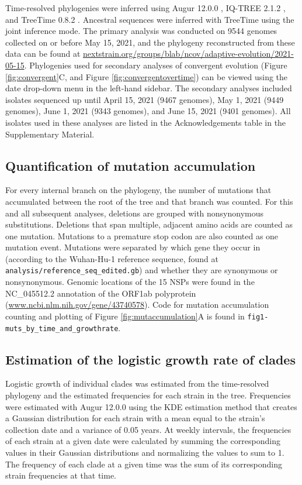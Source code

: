 \documentclass[11pt,oneside,letterpaper]{article}
\begin{document}
Time-resolved phylogenies were inferred using Augur 12.0.0 \cite{Huddleston2021-uh}, IQ-TREE 2.1.2 \cite{Nguyen2015-bp}, and TreeTime 0.8.2 \cite{Sagulenko2018-ok}.
Ancestral sequences were inferred with TreeTime using the joint inference mode. The primary analysis was conducted on 9544 genomes collected on or before May 15, 2021, and the phylogeny reconstructed from these data can be found at \href{https://nextstrain.org/groups/blab/ncov/adaptive-evolution/2021-05-15}{nextstrain.org/groups/blab/ncov/adaptive-evolution/2021-05-15}.
Phylogenies used for secondary analyses of convergent evolution (Figure \ref{fig:convergent}C, and Figure \ref{fig:convergentovertime}) can be viewed using the date drop-down menu in the left-hand sidebar.
The secondary analyses included isolates sequenced up until April 15, 2021 (9467 genomes), May 1, 2021 (9449 genomes), June 1, 2021 (9343 genomes), and June 15, 2021 (9401 genomes).
All isolates used in these analyses are listed in the Acknowledgements table in the Supplementary Material.

\subsection*{Quantification of mutation accumulation}
For every internal branch on the phylogeny, the number of mutations that accumulated between the root of the tree and that branch was counted.
For this and all subsequent analyses, deletions are grouped with nonsynonymous substitutions. Deletions that span multiple, adjacent amino acids are counted as one mutation.
Mutations to a premature stop codon are also counted as one mutation event.
Mutations were separated by which gene they occur in (according to the Wuhan-Hu-1 reference sequence, found at \texttt{analysis/reference\_seq\_edited.gb}) and whether they are synonymous or nonsynonymous.
Genomic locations of the 15 NSPs were found in the NC\_045512.2 annotation of the ORF1ab polyprotein (\href{https://www.ncbi.nlm.nih.gov/gene/43740578}{www.ncbi.nlm.nih.gov/gene/43740578}). Code for mutation accumulation counting and plotting of Figure \ref{fig:mutaccumulation}A is found in \texttt{fig1-muts\_by\_time\_and\_growthrate}.

\subsection*{Estimation of the logistic growth rate of clades}
Logistic growth of individual clades was estimated from the time-resolved phylogeny and the estimated frequencies for each strain in the tree.
Frequencies were estimated with Augur 12.0.0 \cite{Huddleston2021-uh} using the KDE estimation method that creates a Gaussian distribution for each strain with a mean equal to the strain's collection date and a variance of 0.05 years.
At weekly intervals, the frequencies of each strain at a given date were calculated by summing the corresponding values in their Gaussian distributions and normalizing the values to sum to 1.
The frequency of each clade at a given time was the sum of its corresponding strain frequencies at that time.
\end{document}
